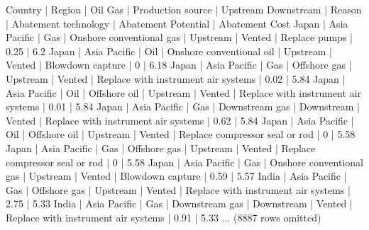 \documentclass[letterpaper,10pt,english]{jupyterBook}
\begin{document}
\begin{sphinxVerbatim}[commandchars=\\\{\}]
Country | Region       | Oil Gas | Production source        | Upstream Downstream | Reason | Abatement technology                | Abatement Potential | Abatement Cost
Japan   | Asia Pacific | Gas     | Onshore conventional gas | Upstream            | Vented | Replace pumps                       | 0.25                | \PYGZhy{}6.2
Japan   | Asia Pacific | Oil     | Onshore conventional oil | Upstream            | Vented | Blowdown capture                    | 0                   | \PYGZhy{}6.18
Japan   | Asia Pacific | Gas     | Offshore gas             | Upstream            | Vented | Replace with instrument air systems | 0.02                | \PYGZhy{}5.84
Japan   | Asia Pacific | Oil     | Offshore oil             | Upstream            | Vented | Replace with instrument air systems | 0.01                | \PYGZhy{}5.84
Japan   | Asia Pacific | Gas     | Downstream gas           | Downstream          | Vented | Replace with instrument air systems | 0.62                | \PYGZhy{}5.84
Japan   | Asia Pacific | Oil     | Offshore oil             | Upstream            | Vented | Replace compressor seal or rod      | 0                   | \PYGZhy{}5.58
Japan   | Asia Pacific | Gas     | Offshore gas             | Upstream            | Vented | Replace compressor seal or rod      | 0                   | \PYGZhy{}5.58
Japan   | Asia Pacific | Gas     | Onshore conventional gas | Upstream            | Vented | Blowdown capture                    | 0.59                | \PYGZhy{}5.57
India   | Asia Pacific | Gas     | Offshore gas             | Upstream            | Vented | Replace with instrument air systems | 2.75                | \PYGZhy{}5.33
India   | Asia Pacific | Gas     | Downstream gas           | Downstream          | Vented | Replace with instrument air systems | 0.91                | \PYGZhy{}5.33
... (8887 rows omitted)
\end{sphinxVerbatim}

\begin{sphinxVerbatim}[commandchars=\\\{\}]
  
   
\end{sphinxVerbatim}
\end{document}
